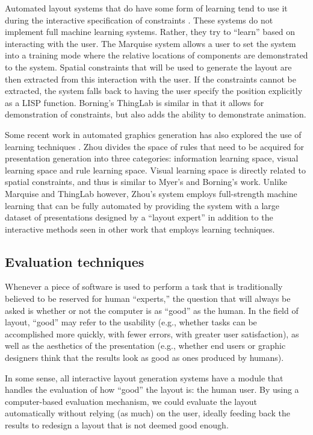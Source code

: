     Automated layout systems that do have some form of learning tend to use it
    during the interactive specification of constraints
    \citep{myers-1,borning-1}. These systems do not implement full machine
    learning systems. Rather, they try to “learn” based on interacting with the
    user. The Marquise system \citep{myers-1} allows a user to set the system
    into a training mode where the relative locations of components are
    demonstrated to the system. Spatial constraints that will be used to
    generate the layout are then extracted from this interaction with the user.
    If the constraints cannot be extracted, the system falls back to having the
    user specify the position explicitly as a LISP function. Borning’s
    \citep{borning-1} ThingLab is similar in that it allows for demonstration
    of constraints, but also adds the ability to demonstrate animation.

    Some recent work in automated graphics generation has also explored the use of learning techniques \citep{zhou-3}. Zhou divides the space of rules that need to be acquired for presentation generation into three categories: information learning space, visual learning space and rule learning space. Visual learning space is directly related to spatial constraints, and thus is similar to Myer’s and Borning’s work. Unlike Marquise and ThingLab however, Zhou’s system employs full-strength machine learning that can be fully automated by providing the system with a large dataset of presentations designed by a “layout expert” in addition to the interactive methods seen in other work that employs learning techniques.

   \subsection{Evaluation techniques}
    \label{evaluation-techniques}

    Whenever a piece of software is used to perform a task that is
    traditionally believed to be reserved for human “experts,” the question
    that will always be asked is whether or not the computer is as “good” as
    the human. In the field of layout, “good” may refer to the usability (e.g.,
    whether tasks can be accomplished more quickly, with fewer errors, with
    greater user satisfaction), as well as the aesthetics of the presentation
    (e.g., whether end users or graphic designers think that the results look
    as good as ones produced by humans).

    In some sense, all interactive layout generation systems have a module that
    handles the evaluation of how “good” the layout is: the human user. By
    using a computer-based evaluation mechanism, we could evaluate the layout
    automatically without relying (as much) on the user, ideally feeding back
    the results to redesign a layout that is not deemed good enough.

